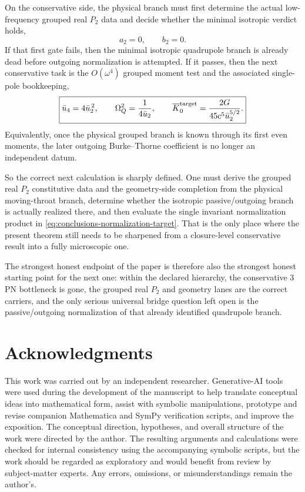 \documentclass[11pt]{article}
\begin{document}
On the conservative side, the physical branch must first determine the actual
low-frequency grouped real $P_2$ data and decide whether the minimal isotropic
verdict holds,
\begin{equation}
\boxed{a_2=0,
\qquad
b_2=0.}
\label{eq:conclusions-first-isotropy-gate}
\end{equation}
If that first gate fails, then the minimal isotropic quadrupole branch is
already dead before outgoing normalization is attempted.  If it passes, then the
next conservative task is the $O(\omega^4)$ grouped moment test and the
associated single-pole bookkeeping,
\begin{equation}
\boxed{
\bar u_4=4\bar u_2^{\,2},
\qquad
\Omega_Q^2=\frac{1}{4\bar u_2},
\qquad
\overline K_0^{\rm target}=\frac{2G}{45c^5\bar u_2^{5/2}}.
}
\label{eq:conclusions-second-isotropy-gate}
\end{equation}
Equivalently, once the physical grouped branch is known through its first even
moments, the later outgoing Burke--Thorne coefficient is no longer an
independent datum.

So the correct next calculation is sharply defined.  One must derive the grouped
real $P_2$ constitutive data and the geometry-side completion from the physical
moving-throat branch, determine whether the isotropic passive/outgoing branch is
actually realized there, and then evaluate the single invariant normalization
product in \eqref{eq:conclusions-normalization-target}.  That is the only place
where the present theorem still needs to be sharpened from a closure-level
conservative result into a fully microscopic one.

The strongest honest endpoint of the paper is therefore also the strongest honest
starting point for the next one: within the declared hierarchy, the conservative
$3$PN bottleneck is gone, the grouped real $P_2$ and geometry lanes are the
correct carriers, and the only serious universal bridge question left open is
the passive/outgoing normalization of that already identified quadrupole branch.

\section*{Acknowledgments}
This work was carried out by an independent researcher. Generative-AI tools were used
during the development of the manuscript to help translate conceptual ideas into
mathematical form, assist with symbolic manipulations, prototype and revise companion
Mathematica and SymPy verification scripts, and improve the exposition. The conceptual
direction, hypotheses, and overall structure of the work were directed by the author. The
resulting arguments and calculations were checked for internal consistency using the
accompanying symbolic scripts, but the work should be regarded as exploratory and would
benefit from review by subject-matter experts. Any errors, omissions, or misunderstandings
remain the author's.
\end{document}
